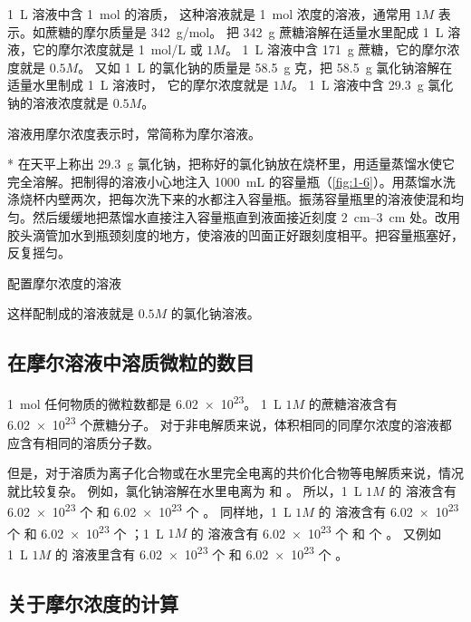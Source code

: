 \qty{1}{L} 溶液中含 \qty{1}{mol} 的溶质， 这种溶液就是 \qty{1}{mol} 浓度的溶液，通常用 $1M$ 表示。如蔗糖的摩尔质量是 \qty{342}{g/mol}。
把 \qty{342}{g} 蔗糖溶解在适量水里配成 \qty{1}{L} 溶液，它的摩尔浓度就是 \qty{1}{mol/L} 或 $1M$。
\qty{1}{L} 溶液中含 \qty{171}{g} 蔗糖，它的摩尔浓度就是 $0.5M$。
又如 \qty{1}{L} 的氯化钠的质量是 \qty{58.5}{g} 克，把 \qty{58.5}{g} 氯化钠溶解在适量水里制成 \qty{1}{L} 溶液时， 它的摩尔浓度就是 $1M$。
\qty{1}{L} 溶液中含 \qty{29.3}{g} 氯化钠的溶液浓度就是 $0.5M$。

溶液用摩尔浓度表示时，常简称为摩尔溶液。

\begin{Experiment}*%
  在天平上称出 \qty{29.3}{g} 氯化钠，把称好的氯化钠放在烧杯里，用适量蒸馏水使它完全溶解。把制得的溶液小心地注入 \qty{1000}{mL} 的容量瓶（\cref{fig:1-6}）。用蒸馏水洗涤烧杯内壁两次，把每次洗下来的水都注入容量瓶。振荡容量瓶里的溶液使混和均匀。然后缓缓地把蒸馏水直接注入容量瓶直到液面接近刻度 \qtyrange{2}{3}{cm} 处。改用胶头滴管加水到瓶颈刻度的地方，使溶液的凹面正好跟刻度相平。把容量瓶塞好，反复摇匀。
  \tcblower
  \begin{figurehere}
    \caption{配置摩尔浓度的溶液}\label{fig:1-6}
  \end{figurehere}
\end{Experiment}

这样配制成的溶液就是 $0.5M$ 的氯化钠溶液。

\subsection{在摩尔溶液中溶质微粒的数目}

\qty{1}{mol} 任何物质的微粒数都是 \num{6.02e23}。
\qty{1}{L} $1M$ 的蔗糖溶液含有 \num{6.02e23} 个蔗糖分子。
对于非电解质来说，体积相同的同摩尔浓度的溶液都应含有相同的溶质分子数。

但是，对于溶质为离子化合物或在水里完全电离的共价化合物等电解质来说，情况就比较复杂。
例如，氯化钠溶解在水里电离为  和 。
所以，\qty{1}{L} $1M$ 的  溶液含有 \num{6.02e23} 个  和 \num{6.02e23} 个 。
同样地，\qty{1}{L} $1M$ 的  溶液含有 \num{6.02e23} 个  和 \num{6.02e23} 个 ；\qty{1}{L} $1M$ 的  溶液含有 \num{6.02e23} 个  和  个 。
又例如 \qty{1}{L} $1M$ 的  溶液里含有 \num{6.02e23} 个  和 \num{6.02e23} 个 。

\subsection{关于摩尔浓度的计算}
